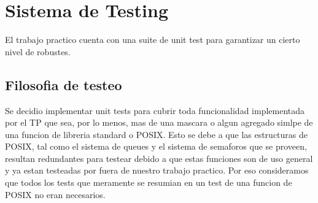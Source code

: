 \documentclass[10pt,a4paper]{report}
\begin{document}
\section{Sistema de Testing}
El trabajo practico cuenta con una suite de unit test para garantizar un cierto nivel de robustes.
\subsection{Filosofia de testeo}
Se decidio implementar unit tests para cubrir toda funcionalidad implementada por el TP que sea, por lo menos, mas de una mascara o algun agregado simlpe de una funcion de libreria standard o POSIX. 
Esto se debe a que las estructuras de POSIX, tal como el sistema de queues y el sistema de semaforos que se proveen, resultan redundantes para testear debido a que estas funciones son de uso general y ya estan testeadas por fuera de nuestro trabajo practico. Por eso consideramos que todos los tests que meramente se resumian en un test de una funcion de POSIX no eran necesarios.
\end{document}
